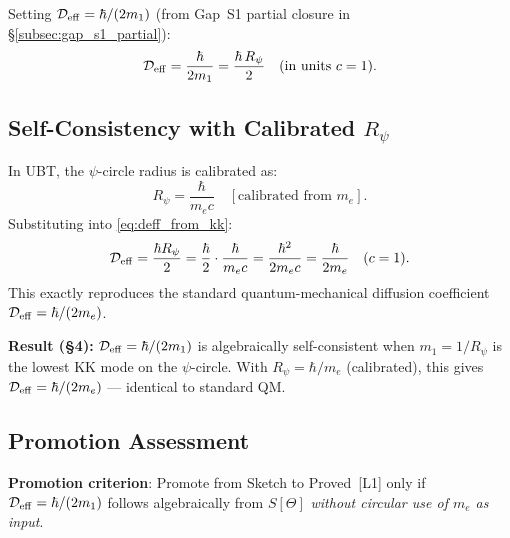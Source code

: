 \documentclass[12pt]{article}
\theoremstyle{definition}
\theoremstyle{remark}
\begin{document}
Setting $\mathcal{D}_{\rm eff} = \hbar/(2m_1)$ (from Gap~S1 partial
closure in \S\ref{subsec:gap_s1_partial}):
\begin{equation}
  \mathcal{D}_{\rm eff} = \frac{\hbar}{2m_1} = \frac{\hbar\,R_\psi}{2}
  \quad (\text{in units } c = 1).
  \label{eq:deff_from_kk}
\end{equation}

\subsection{Self-Consistency with Calibrated $R_\psi$}

In UBT, the $\psi$-circle radius is calibrated as:
\begin{equation}
  R_\psi = \frac{\hbar}{m_e c}
  \quad [\text{calibrated from } m_e].
  \label{eq:rpsi_calibrated}
\end{equation}
Substituting into \eqref{eq:deff_from_kk}:
\begin{equation}
  \mathcal{D}_{\rm eff} = \frac{\hbar R_\psi}{2}
    = \frac{\hbar}{2}\cdot\frac{\hbar}{m_e c}
    = \frac{\hbar^2}{2m_e c}
    = \frac{\hbar}{2m_e}
  \quad (c = 1).
\end{equation}
This exactly reproduces the standard quantum-mechanical diffusion coefficient
$\mathcal{D}_{\rm eff} = \hbar/(2m_e)$.

\begin{resultbox}
\textbf{Result (§4):} $\mathcal{D}_{\rm eff} = \hbar/(2m_1)$ is algebraically
self-consistent when $m_1 = 1/R_\psi$ is the lowest KK mode on the
$\psi$-circle.  With $R_\psi = \hbar/m_e$ (calibrated), this gives
$\mathcal{D}_{\rm eff} = \hbar/(2m_e)$ — identical to standard QM.
\end{resultbox}

\subsection{Promotion Assessment}

\textbf{Promotion criterion}: Promote from Sketch to Proved~[L1] only if
$\mathcal{D}_{\rm eff} = \hbar/(2m_1)$ follows algebraically from $S[\Theta]$
\emph{without circular use of $m_e$ as input}.
\end{document}
